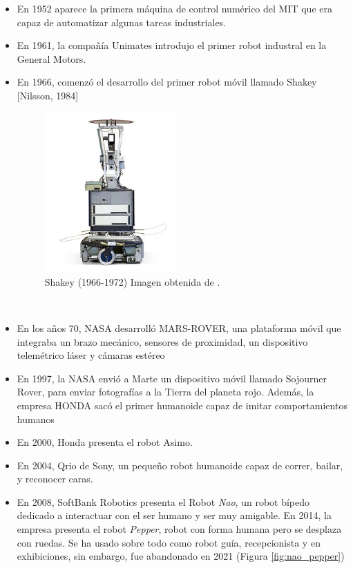 \begin {itemize}
	\item En 1952 aparece la primera máquina de control numérico del MIT que era capaz de automatizar algunas tareas industriales.
	\item En 1961, la compañía Unimates introdujo el primer robot industral en la General Motors.
	\item En 1966, comenzó el desarrollo del primer robot móvil llamado Shakey [Nilsson, 1984]
	\begin{figure} [H]
	\begin{center}
	\includegraphics[width=5cm]{imagenes/shakey.jpg}
	\end{center}
	\caption[Shakey (1966-1972)]{Shakey (1966-1972) Imagen obtenida de \cite{shakey-the-robot}.}
	\label{fig:shakey}
	\end{figure}\
	\item En los años 70, NASA desarrolló MARS-ROVER, una plataforma móvil que integraba un brazo mecánico, sensores de proximidad, un dispositivo telemétrico láser y cámaras estéreo
	\item En 1997, la NASA envió a Marte un dispositivo móvil llamado Sojourner Rover, para enviar fotografías a la Tierra del planeta rojo. Además, la empresa HONDA sacó el primer humanoide capaz de imitar comportamientos humanos
	\item En 2000, Honda presenta el robot Asimo.
	\item En 2004, Qrio de Sony, un pequeño robot humanoide capaz de correr, bailar, y reconocer caras.
	\item En 2008, SoftBank Robotics presenta el Robot \textit{Nao}, un robot bípedo dedicado a interactuar con el ser humano y ser muy amigable. En 2014, la empresa presenta el robot \textit{Pepper}, robot con forma humana pero se desplaza con ruedas. Se ha usado sobre todo como robot guía, recepcionista y en exhibiciones, sin embargo, fue abandonado en 2021 (Figura \ref{fig:nao_pepper})

\end{itemize}
